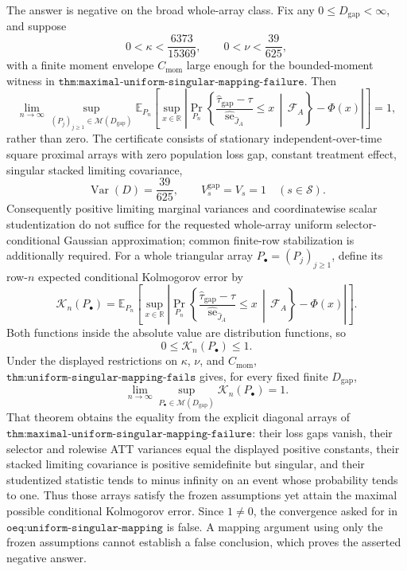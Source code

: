 The answer is negative on the broad whole-array class.  Fix any \(0\leq D_{\mathrm{gap}}<\infty\), and suppose
\[
 0<\kappa<\frac{6373}{15369},
 \qquad
 0<\nu<\frac{39}{625},
\]
with a finite moment envelope \(C_{\mathrm{mom}}\) large enough for the bounded-moment witness in \(\texttt{thm:maximal-uniform-singular-mapping-failure}\).  Then
\[
 \lim_{n\to\infty}
 \sup_{(P_j)_{j\geq1}\in\mathcal M(D_{\mathrm{gap}})}
 \mathbb E_{P_n}\!\left[
  \sup_{x\in\mathbb R}
  \left|
   \Pr_{P_n}\!\left\{
    \frac{\widehat\tau_{\mathrm{gap}}-\tau}
         {\widehat{\operatorname{se}}_{\widehat J_A}}
    \leq x\,\middle|\,\mathcal F_A
   \right\}-\Phi(x)
  \right|
 \right]
 =1,
\]
rather than zero.  The certificate consists of stationary independent-over-time square proximal arrays with zero population loss gap, constant treatment effect, singular stacked limiting covariance,
\[
 \operatorname{Var}(D)=\frac{39}{625},
 \qquad
 V_s^{\mathrm{gap}}=V_s=1
 \quad(s\in\mathcal S).
\]
Consequently positive limiting marginal variances and coordinatewise scalar studentization do not suffice for the requested whole-array uniform selector-conditional Gaussian approximation; common finite-row stabilization is additionally required.
For a whole triangular array \(P_\bullet=(P_j)_{j\geq1}\), define its row-\(n\) expected conditional Kolmogorov error by
\[
 \mathcal K_n(P_\bullet)
 =\mathbb E_{P_n}\!\left[
  \sup_{x\in\mathbb R}
  \left|
   \Pr_{P_n}\!\left\{
    \frac{\widehat\tau_{\mathrm{gap}}-\tau}
         {\widehat{\operatorname{se}}_{\widehat J_A}}
    \leq x\,\middle|\,\mathcal F_A
   \right\}-\Phi(x)
  \right|
 \right].
\]
Both functions inside the absolute value are distribution functions, so
\[
 0\leq\mathcal K_n(P_\bullet)\leq1.
\]
Under the displayed restrictions on \(\kappa\), \(\nu\), and \(C_{\mathrm{mom}}\), \(\texttt{thm:uniform-singular-mapping-fails}\) gives, for every fixed finite \(D_{\mathrm{gap}}\),
\[
 \lim_{n\to\infty}
 \sup_{P_\bullet\in\mathcal M(D_{\mathrm{gap}})}
 \mathcal K_n(P_\bullet)=1.
\]
That theorem obtains the equality from the explicit diagonal arrays of \(\texttt{thm:maximal-uniform-singular-mapping-failure}\): their loss gaps vanish, their selector and rolewise ATT variances equal the displayed positive constants, their stacked limiting covariance is positive semidefinite but singular, and their studentized statistic tends to minus infinity on an event whose probability tends to one.  Thus those arrays satisfy the frozen assumptions yet attain the maximal possible conditional Kolmogorov error.  Since \(1\neq0\), the convergence asked for in \(\texttt{oeq:uniform-singular-mapping}\) is false.  A mapping argument using only the frozen assumptions cannot establish a false conclusion, which proves the asserted negative answer.
